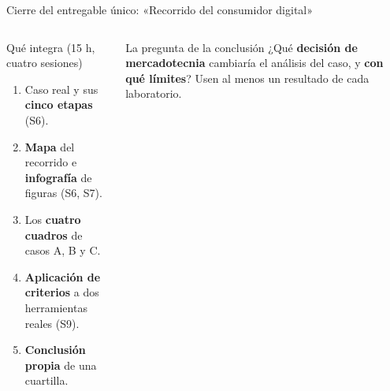 \documentclass[aspectratio=169,xcolor=dvipsnames]{beamer}
\begin{document}
\begin{frame}{Cierre del entregable único: «Recorrido del consumidor digital»}
\begin{columns}[T]
  \begin{block}{Qué integra (15 h, cuatro sesiones)}
    \scriptsize
    \begin{enumerate}
      \item Caso real y sus \textbf{cinco etapas} (S6).
      \item \textbf{Mapa} del recorrido e \textbf{infografía} de figuras (S6, S7).
      \item Los \textbf{cuatro cuadros} de casos A, B y C.
      \item \textbf{Aplicación de criterios} a dos herramientas reales (S9).
      \item \textbf{Conclusión propia} de una cuartilla.
    \end{enumerate}
  \end{block}
  \begin{alertblock}{La pregunta de la conclusión}
    \small ¿Qué \textbf{decisión de mercadotecnia} cambiaría el análisis del caso, y \textbf{con qué límites}? Usen al menos un resultado de cada laboratorio.
  \end{alertblock}
\end{columns}
\end{frame}
\end{document}
